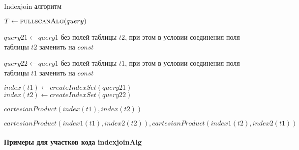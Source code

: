 \begin{algorithm}[h]
\caption{Indexjoin алгоритм}\label{alg:indexjoin}
\begin{algorithmic}[1]
 

    \State $T \gets \Call{fullscanAlg}{query}$
    \Statex 
    
    \Else
    \EndIf
    \Statex 

    \State $query21 \gets query1$ без полей таблицы $t2$, при этом в условии соединения поля таблицы $t2$ заменить на $const$
    \Statex

    \State $query22 \gets query1$ без полей таблицы $t1$, при этом в условии соединения поля таблицы $t1$ заменить на $const$
    \Statex

    \State $index(t1) \gets createIndexSet(query21)$
    \State $index(t2) \gets createIndexSet(query22)$
    \Statex

        \Statex

        \State \Return $cartesianProduct(index(t1), index(t2))$
    \EndIf
    \Statex

    \Statex{}
    \Statex{}

    \State \Return $cartesianProduct(index1(t1), index2(t2)), cartesianProduct(index1(t2), index2(t1))$
\EndFunction

\end{algorithmic}
\end{algorithm}


\paragraph{Примеры для участков кода indexjoinAlg}

